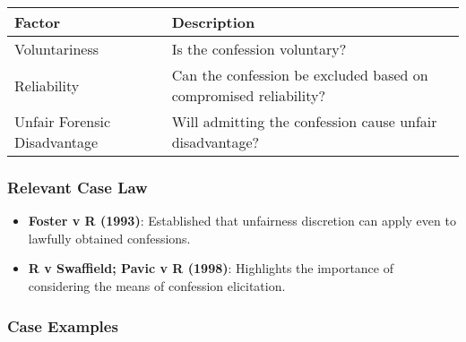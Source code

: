 \begin{longtable}[]{@{}
  >{\raggedright\arraybackslash}p{}
  >{\raggedright\arraybackslash}p{}@{}}
\toprule\noalign{}
\begin{minipage}[b]{\linewidth}\raggedright
Factor
\end{minipage} & \begin{minipage}[b]{\linewidth}\raggedright
Description
\end{minipage} \\
\midrule\noalign{}
\endhead
\bottomrule\noalign{}
\endlastfoot
Voluntariness & Is the confession voluntary? \\
Reliability & Can the confession be excluded based on compromised
reliability? \\
Unfair Forensic Disadvantage & Will admitting the confession cause
unfair disadvantage? \\
\end{longtable}

\subsubsection{Relevant Case Law}\label{relevant-case-law-1}

\begin{itemize}
\tightlist
\item
  \textbf{Foster v R (1993)}: Established that unfairness discretion can
  apply even to lawfully obtained confessions.
\item
  \textbf{R v Swaffield; Pavic v R (1998)}: Highlights the importance of
  considering the means of confession elicitation.
\end{itemize}

\subsubsection{Case Examples}\label{case-examples-2}

